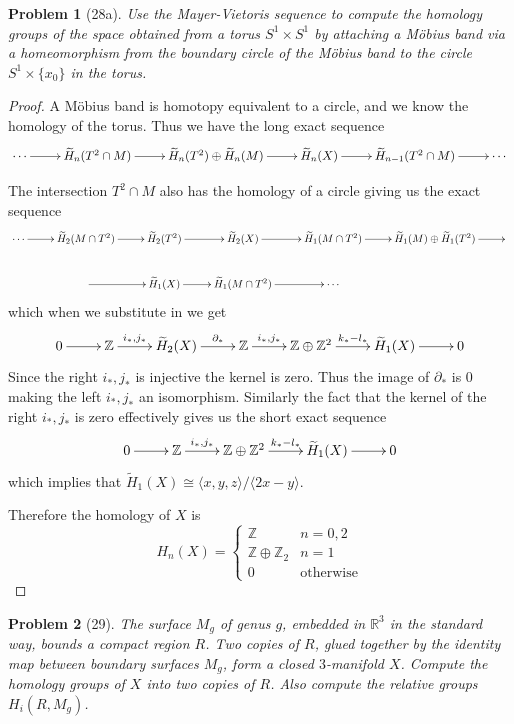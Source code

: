 \documentclass[10pt]{article}
\newcommand{\sk}{\vskip 10mm}
\newcommand{\bb}[1]{\mathbb{#1}}
\newcommand{\rH}{\widetilde{H}}
\theoremstyle{plain}
\newtheorem{problem}{Problem}
\theoremstyle{remark}
\begin{document}
\begin{problem}[28a]
  Use the Mayer-Vietoris sequence to compute the homology groups of the space
  obtained from a torus $S^1\times S^1$ by attaching a M\"obius band via a
  homeomorphism from the boundary circle of the M\"obius band to the
  circle $S^1\times \{ x_0\}$ in the torus. 
\end{problem}

\begin{proof}
  A M\"obius band is homotopy equivalent to a circle, and we know the homology
  of the torus. Thus we have the long exact sequence
  \[
    \xymatrix{
      \cdots \ar[r] & \rH_n(T^2\cap M) \ar[r] & \rH_n(T^2)\oplus \rH_n(M) \ar[r] & \rH_n(X) \ar[r] & \rH_{n-1}(T^2\cap M) \ar[r] & \cdots
    }
  \]

  The intersection $T^2\cap M$ also has the homology of a circle giving us the exact sequence
  \[
    \xymatrix{
      \cdots \ar[r] & \rH_2(M\cap T^2) \ar[r] & \rH_2(T^2) \ar[r] & \rH_2(X) \ar[r] & \rH_1(M\cap T^2) \ar[r] & \rH_1(M)\oplus\rH_1(T^2) \ar[r] & \\
      &\ar[r] & \rH_1(X) \ar[r] & \rH_1(M\cap T^2) \ar[r] & \cdots
    }
  \]
  which when we substitute in we get
  \[
    \xymatrix{
      0 \ar[r] & \bb{Z} \ar[r]^-{i_*,j_*} & \rH_2(X) \ar[r]^-{\partial_*} & \bb{Z} \ar[r]^-{i_*,j_*} & \bb{Z}\oplus\bb{Z}^2 \ar[r]^-{k_*-l_*} & \rH_1(X) \ar[r] & 0
    }
  \]
  Since the right $i_*,j_*$ is injective the kernel is zero. Thus the image of $\partial_*$
  is 0 making the left $i_*,j_*$ an isomorphism. Similarly the fact that the kernel
  of the right $i_*,j_*$ is zero effectively gives us the short exact sequence
  \[
    \xymatrix{
      0 \ar[r] & \bb{Z} \ar[r]^-{i_*,j_*} & \bb{Z}\oplus\bb{Z}^2 \ar[r]^-{k_*-l_*} & \rH_1(X) \ar[r] & 0
    }
  \]
  which implies that $\rH_1(X)\cong \langle x,y,z\rangle/\langle 2x-y\rangle$.

  Therefore the homology of $X$ is
  \[
    H_n(X) =
    \left\{
      \begin{array}{cr}
        \bb{Z} & n=0,2\\
        \bb{Z}\oplus\bb{Z}_2 & n=1\\
        0 & \text{otherwise}
      \end{array}
    \right.
  \]
  
\end{proof}

\sk

\begin{problem}[29]
  The surface $M_g$ of genus $g$, embedded in $\bb{R}^3$ in the standard way,
  bounds a compact region $R$. Two copies of $R$, glued together by the identity
  map between boundary surfaces $M_g$, form a closed $3$-manifold $X$.
  Compute the homology groups of $X$ into two copies of $R$. Also compute the
  relative groups $H_i(R,M_g)$.
\end{problem}
\end{document}
